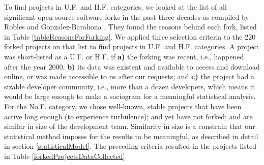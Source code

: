 \documentclass[11pt]{report}
\begin{document}
To find projects in U.F. and H.F. categories, we looked at the list of all significant open source software forks in the past three decades as compiled by Robles and Gonzalez-Barahona \cite{Robles}. They found the reasons behind each fork, listed in Table \ref{tableReasonsForForking}. We applied three selection criteria to the 220 forked projects on that list to find projects in U.F. and H.F. categories. A project was short-listed as a U.F. or H.F. if \textbf{a)} the forking was recent, i.e., happened after the year 2000, \textbf{b)} its data was existent and available to access and download online, or was made accessible to us after our requests; and \textbf{c)} the project had a sizable developer community, i.e., more than a dozen developers, which means it would be large enough to make a sociogram for a meaningful statistical analysis. For the No.F. category, we chose well-known, stable projects that have been active long enough (to experience turbulence); and yet have not forked; and are similar in size of the development team. Similarity in size is a constrain that our statistical method imposes for the results to be meaningful, as described in detail in section \ref{statisticalModel}.  The preceding criteria resulted in the projects listed in Table \ref{forkedProjectsDataCollected}. 
\end{document}
